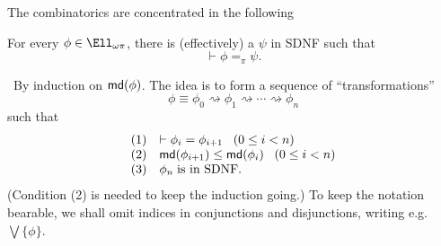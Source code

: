 The combinatorics are concentrated in the following 
\begin{theorem}[SDNF]
\label{SDNF}
For every $\phi \in \Ell_{\omega \pi}$, there is (effectively) a $\psi$ in SDNF such that 
\[ \vdash  \phi =_{\pi} \psi . \]
\end{theorem}

\proof\ By induction on ${\sf md}(\phi )$.
The idea is to form a sequence of ``transformations''
\[ \phi \equiv \phi_{0} \rightsquigarrow \phi_{1} \rightsquigarrow \cdots 
\rightsquigarrow \phi_{n} \]
such that
\[ \begin{array}{ll}
(1) & \vdash  \phi_{i} = \phi_{i+1} \;\;\; (0 \leq i < n) \\
(2) & {\sf md}(\phi_{i+1}) \leq {\sf md}(\phi_{i}) \;\;\; (0 \leq i < n) \\
(3) & \phi_{n} \; \mbox{is in SDNF.}
\end{array} \]
(Condition (2) is needed to keep the induction going.)
To keep the notation bearable, we shall omit indices in conjunctions and disjunctions, writing e.g. $\bigvee \{ \phi \}$.

